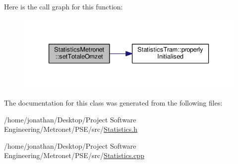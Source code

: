 Here is the call graph for this function\+:
\nopagebreak
\begin{figure}[H]
\begin{center}
\leavevmode
\includegraphics[width=333pt]{class_statistics_metronet_a84d1ec559861a5248975ce06bca06d0c_cgraph}
\end{center}
\end{figure}




The documentation for this class was generated from the following files\+:\begin{DoxyCompactItemize}
\item 
/home/jonathan/\+Desktop/\+Project Software Engineering/\+Metronet/\+P\+S\+E/src/\hyperlink{_statistics_8h}{Statistics.\+h}\item 
/home/jonathan/\+Desktop/\+Project Software Engineering/\+Metronet/\+P\+S\+E/src/\hyperlink{_statistics_8cpp}{Statistics.\+cpp}\end{DoxyCompactItemize}
